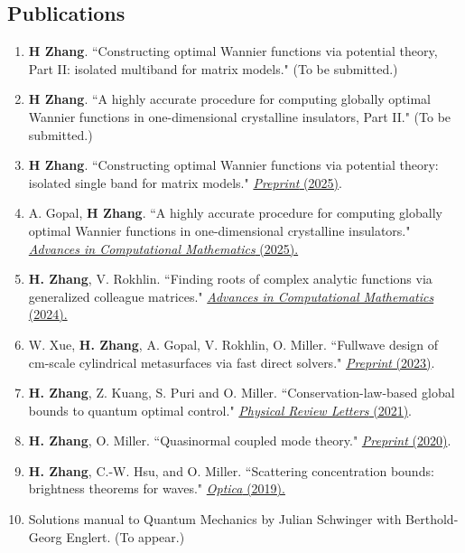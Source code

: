 \documentclass[margin,line,pifont,palatino,courier]{res}
\begin{document}
\begin{resume}
\section{\sc Publications}
\begin{enumerate}
\setlength\itemsep{0em}
	\item{\textbf{H Zhang}. ``Constructing optimal Wannier functions via potential theory,\\ Part II: isolated multiband for matrix models." (To be submitted.) }
	\item{ \textbf{H Zhang}. ``A highly accurate procedure for computing globally optimal Wannier functions in one-dimensional crystalline insulators, Part II." (To be submitted.) }
	\item{\textbf{H Zhang}. ``Constructing optimal Wannier functions via potential theory: isolated single band for matrix models." \href{https://arxiv.org/abs/2502.08641}{\color{blue} \emph{Preprint} (2025)}.}
	\item{A. Gopal, \textbf{H Zhang}. ``A highly accurate procedure for computing globally optimal Wannier functions in one-dimensional crystalline insulators." \href{https://link.springer.com/article/10.1007/s10444-025-10266-4}{\color{blue}  \emph{Advances in Computational Mathematics} (2025).}}
	\item \textbf{H. Zhang}, V. Rokhlin. ``Finding roots of complex analytic functions via generalized colleague matrices." \href{https://link.springer.com/article/10.1007/s10444-024-10174-z}{\color{blue}  \emph{Advances in Computational Mathematics} (2024).}
	\item W. Xue, \textbf{H. Zhang}, A. Gopal, V. Rokhlin, O. Miller. ``Fullwave design of cm-scale cylindrical metasurfaces via fast direct solvers." \href{https://arxiv.org/abs/2308.08569}{\color{blue} \emph{Preprint} (2023)}.
	\item{\textbf{H. Zhang}, Z. Kuang, S. Puri and O. Miller. ``Conservation-law-based global bounds to quantum optimal control." \href{https://journals.aps.org/prl/abstract/10.1103/PhysRevLett.127.110506}{\color{blue} \emph{Physical Review Letters} (2021)}.}
	\item{\textbf{H. Zhang}, O. Miller. ``Quasinormal coupled mode theory." \href{https://arxiv.org/abs/2010.08650}{\color{blue} \emph{Preprint} (2020)}.}
	\item{\textbf{H. Zhang}, C.-W. Hsu, and O. Miller. ``Scattering concentration bounds: brightness theorems for waves." \href{https://doi.org/10.1364/OPTICA.6.001321}{\color{blue} \emph{Optica} (2019).}}
	\item{Solutions manual to Quantum Mechanics by Julian Schwinger with Berthold-Georg Englert. (To appear.)}
\end{enumerate}


\end{resume}
\end{document}

